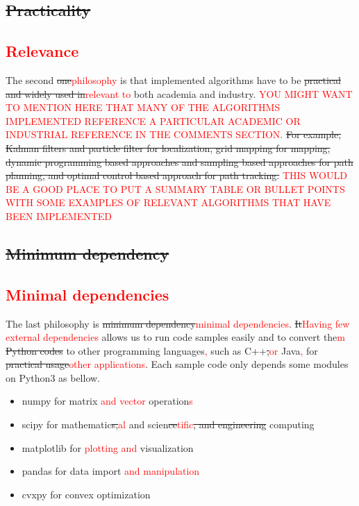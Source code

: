 \documentclass{bmvc2k}
\def\jwd{\textcolor{red}}
\begin{document}
\subsection{\st{Practicality}}
\subsection{\jwd{Relevance}}
The second \st{one}\jwd{philosophy} is that implemented algorithms have to be \st{practical and widely used in}\jwd{relevant to} both academia and industry.  \jwd{YOU MIGHT WANT TO MENTION HERE THAT MANY OF THE ALGORITHMS IMPLEMENTED REFERENCE A PARTICULAR ACADEMIC OR INDUSTRIAL REFERENCE IN THE COMMENTS SECTION.}
\st{For example, Kalman filters and particle filter for localization, grid mapping for mapping, dynamic programming based approaches and sampling based approaches for path planning, and optimal control based approach for path tracking.}
\jwd{THIS WOULD BE A GOOD PLACE TO PUT A SUMMARY TABLE OR BULLET POINTS WITH SOME EXAMPLES OF RELEVANT ALGORITHMS THAT HAVE BEEN IMPLEMENTED}

\subsection{\st{Minimum dependency}}
\subsection{\jwd{Minimal dependencies}}
The last philosophy is \st{minimum dependency}\jwd{minimal dependencies}.
\st{It}\jwd{Having few external dependencies} allows us to run code samples easily and to convert the\jwd{m} \st{Python codes} to other programming languages\jwd{,} such as C++\st{,}\jwd{or} Java\jwd{,} for \st{practical usage}\jwd{other applications}.
Each sample code only depends some modules on Python3 as bellow.

\begin{itemize}
 \item numpy\cite{numpy} for matrix \jwd{and vector} operation\jwd{s}
 \item scipy\cite{scipy} for mathematic\st{s,}\jwd{al} and scien\st{ce}\jwd{tific}\st{, and engineering} computing
 \item matplotlib\cite{matplotlib} for \jwd{plotting and }visualization
 \item pandas\cite{pandas} for data import \jwd{and manipulation}
 \item cvxpy\cite{cvxpy} for convex optimization
\end{itemize}
\end{document}
